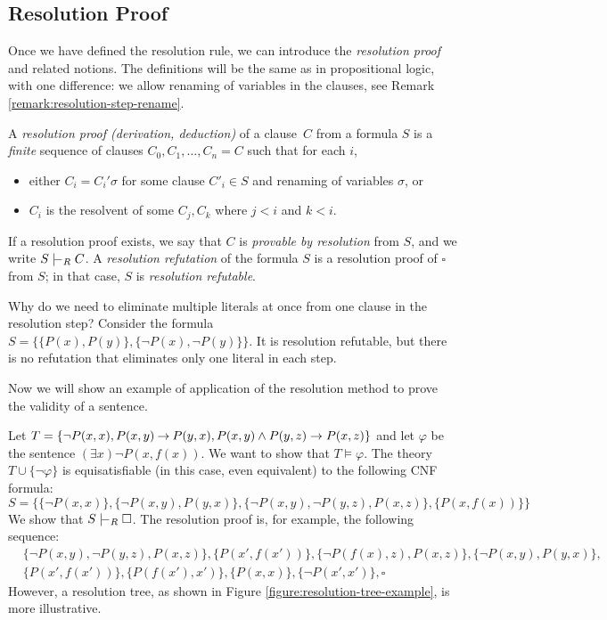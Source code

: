 \subsection{Resolution Proof}

Once we have defined the resolution rule, we can introduce the \emph{resolution proof} and related notions. The definitions will be the same as in propositional logic, with one difference: we allow renaming of variables in the clauses, see Remark \ref{remark:resolution-step-rename}.

\begin{definition}
    A \emph{resolution proof (derivation, deduction)} of a clause~$C$ from a formula $S$ is a \emph{finite} sequence of clauses $C_0,C_1,\dots,C_n=C$
    such that for each $i$,
    \begin{itemize}
        \item either $C_i=C_i'\sigma$ for some clause $C'_i\in S$ and renaming of variables $\sigma$, or
        \item $C_i$ is the resolvent of some $C_j,C_k$ where $j<i$ and $k<i$.
    \end{itemize}
    If a resolution proof exists, we say that $C$ is \emph{provable by resolution} from $S$, and we write $S\proves_R C$. A \emph{resolution refutation} of the formula $S$ is a resolution proof of $\square$ from $S$; in that case, $S$ is \emph{resolution refutable}.
\end{definition}

\begin{remark}
    Why do we need to eliminate multiple literals at once from one clause in the resolution step? Consider the formula $S=\{\{P(x),P(y)\},\{\neg P(x),\neg P(y)\}\}$. It is resolution refutable, but there is no refutation that eliminates only one literal in each step.
\end{remark}

Now we will show an example of application of the resolution method to prove the validity of a sentence.

\begin{example}\label{example:resolution-proof-predicate}
Let $T=\{\neg P(x,x),P(x,y) \mathbin{\rightarrow} P(y,x), P(x,y)\land P(y,z)\to P(x,z)\}$ and let $\varphi$ be the sentence $(\exists x)\neg P(x,f(x))$. We want to show that $T\models\varphi$. The theory $T\cup\{\neg\varphi\}$ is equisatisfiable (in this case, even equivalent) to the following CNF formula:
$$S=\{\{\neg P(x,x)\},\{\neg P(x,y),P(y,x)\},\{\neg P(x,y),\neg P(y,z), P(x,z)\},\{P(x,f(x))\}\}$$
We show that $S\proves_R\square$. The resolution proof is, for example, the following sequence:
\begin{align*}
    &\{\neg P(x,y),\neg P(y,z), P(x,z)\},
    \{P(x',f(x'))\},
    \{\neg P(f(x),z),P(x,z)\},
    \{\neg P(x,y),P(y,x)\},\\
    &\{P(x',f(x'))\},
    \{P(f(x'),x')\},
    \{P(x,x)\},
    \{\neg P(x',x')\},
    \square   
\end{align*}
However, a resolution tree, as shown in Figure \ref{figure:resolution-tree-example}, is more illustrative.
\end{example}

